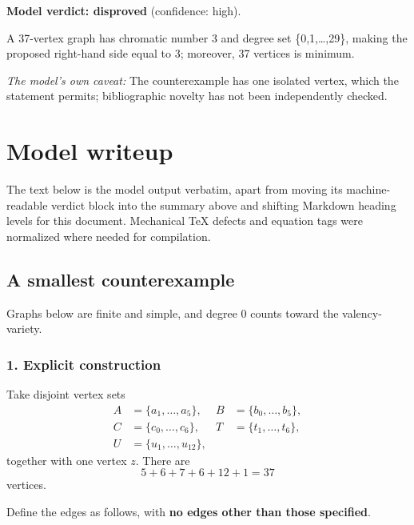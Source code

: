 \documentclass[
  11pt,
  a4paper,
]{article}
\begin{document}
\textbf{Model verdict: disproved} (confidence: high).

A 37-vertex graph has chromatic number 3 and degree set
\{0,1,\ldots,29\}, making the proposed right-hand side equal to 3;
moreover, 37 vertices is minimum.

\emph{The model's own caveat:} The counterexample has one isolated
vertex, which the statement permits; bibliographic novelty has not been
independently checked.

\section{Model writeup}\label{model-writeup}

The text below is the model output verbatim, apart from moving its
machine-readable verdict block into the summary above and shifting
Markdown heading levels for this document. Mechanical TeX defects and
equation tags were normalized where needed for compilation.

\subsection{A smallest counterexample}\label{a-smallest-counterexample}

Graphs below are finite and simple, and degree \(0\) counts toward the
valency-variety.

\subsubsection{1. Explicit construction}\label{explicit-construction}

Take disjoint vertex sets \begin{equation*}
\begin{aligned}
A&=\{a_1,\ldots,a_5\},&
B&=\{b_0,\ldots,b_5\},\\
C&=\{c_0,\ldots,c_6\},&
T&=\{t_1,\ldots,t_6\},\\
U&=\{u_1,\ldots,u_{12}\},
\end{aligned}
\end{equation*} together with one vertex \(z\). There are \[
5+6+7+6+12+1=37
\] vertices.

Define the edges as follows, with \textbf{no edges other than those
specified}.
\end{document}
